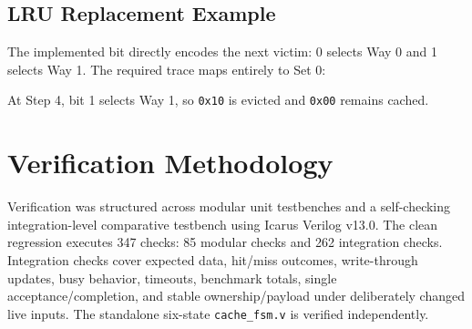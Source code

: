 \documentclass[10pt,twocolumn]{article}
\begin{document}
\subsection{LRU Replacement Example}
The implemented bit directly encodes the next victim: 0 selects Way 0 and 1 selects Way 1. The required trace maps entirely to Set 0:
\begin{table}[htbp]
\centering
\caption{Verified LRU Trace in Set 0}
\end{table}
At Step 4, bit 1 selects Way 1, so \texttt{0x10} is evicted and \texttt{0x00} remains cached.

\section{Verification Methodology}
Verification was structured across modular unit testbenches and a self-checking integration-level comparative testbench using Icarus Verilog v13.0. The clean regression executes 347 checks: 85 modular checks and 262 integration checks. Integration checks cover expected data, hit/miss outcomes, write-through updates, busy behavior, timeouts, benchmark totals, single acceptance/completion, and stable ownership/payload under deliberately changed live inputs. The standalone six-state \texttt{cache\_fsm.v} is verified independently.

\begin{table}[htbp]
\centering
\caption{Comprehensive Verification Suite Results}
\label{tab:verification_summary}
\end{table}
\end{document}
